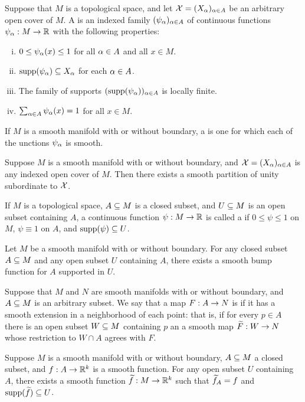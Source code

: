 \dfn Suppose that $M$ is a topological space, and let $\mathcal{X} = (X_\alpha)_{\alpha\in A}$ be an arbitrary open cover of $M$. A  is an indexed family $(\psi_\alpha)_{\alpha\in A}$ of continuous functions $\psi_\alpha:M\rightarrow \mathbb{R}$ with the following properties:
\begin{enumerate}[(i)]
    \item $0 \leq \psi_\alpha(x)\leq 1$ for all $\alpha\in A$ and all $x\in M$.
    \item $\text{supp}(\psi_\alpha) \subseteq X_\alpha$ for each $\alpha\in A$.
    \item The family of supports $(\text{supp}(\psi_\alpha))_{\alpha\in A}$ is locally finite.
    \item $\sum_{\alpha\in A}\psi_\alpha(x) = 1$ for all $x\in M$.
\end{enumerate}
If $M$ is a smooth manifold with or without boundary, a  is one for which each of the unctions $\psi_\alpha$ is smooth.

\begin{thm}
Suppose $M$ is a smooth manifold with or without boundary, and $\mathcal{X} = (X_\alpha)_{\alpha\in A}$ is any indexed open cover of $M$. Then there exists a smooth partition of unity subordinate to $\mathcal{X}$.
\end{thm}

\dfn If $M$ is a topological space, $A\subseteq M$ is a closed subset, and $U\subseteq M$ is an open subset containing $A$, a continuous function $\psi:M\rightarrow \mathbb{R}$ is called a  if $0 \leq \psi \leq 1$ on $M$, $\psi \equiv 1$ on $A$, and $\text{supp}(\psi)\subseteq U$.

\setcounter{thm}{24}

\begin{prop}
Let $M$ be a smooth manifold with or without boundary. For any closed subset $A\subseteq M$ and any open subset $U$ containing $A$, there exists a smooth bump function for $A$ supported in $U$.
\end{prop}

\dfn Suppose that $M$ and $N$ are smooth manifolds with or  without boundary, and $A\subseteq M$ is an arbitrary subset. We say that a map $F:A\rightarrow N$ is  if it has a smooth extension in a neighborhood of each point: that is, if for every $p\in A$ there is an open subset $W\subseteq M$ containing $p$ an a smooth map $\widetilde F:W\rightarrow N$ whose restriction to $W\cap A$ agrees with $F$.

\begin{lem}
Suppose $M$ is a smooth manifold with or without boundary, $A\subseteq M$ a closed subset, and $f:A\rightarrow \mathbb{R}^k$ is a smooth function. For any open subset $U$ containing $A$, there exists a smooth function $\widetilde f:M\rightarrow \mathbb{R}^k$ such that $\widetilde f_A = f$ and $\text{supp}(\widetilde f)\subseteq U$.
\end{lem}

